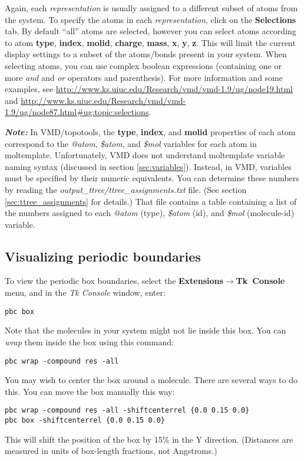 \documentclass[11pt]{article}
\begin{document}
Again, each \textit{representation} is usually assigned to
a different subset of atoms from the system.
To specify the atoms in each \textit{representation}, 
click on the \mbox{\textbf{Selections}} tab.
By default ``all''
atoms are selected, however you can select atoms according to atom 
\textbf{type}, \textbf{index}, \textbf{molid}, 
\textbf{charge}, \textbf{mass}, \textbf{x}, \textbf{y}, \textbf{z}.
This will limit the current display settings to a 
subset of the atoms/bonds present in your system.
When selecting atoms, you can use complex boolean expressions 
(containing one or more \textit{and} and \textit{or} operators 
and parenthesis).
For more information and some examples, 
see \url{http://www.ks.uiuc.edu/Research/vmd/vmd-1.9/ug/node19.html}
and
\url{http://www.ks.uiuc.edu/Research/vmd/vmd-1.9/ug/node87.html#ug:topic:selections}.


\textit{\textbf{Note:}}
In VMD/topotools, 
the \textbf{type}, \textbf{index}, and \textbf{molid} 
properties of each atom correspond 
to the \textit{@atom}, \textit{\$atom}, and \textit{\$mol} 
variables for each atom in moltemplate.
Unfortunately, VMD does not understand moltemplate variable naming syntax
(discussed in section \ref{sec:variables}). 
Instead, in VMD, variables must be 
specified by their numeric equivalents. 
You can determine these numbers by reading the 
\textit{output\_ttree/ttree\_assignments.txt} file.
(See section \ref{sec:ttree_assignments} for details.)
That file contains a table containing a list of the
numbers assigned to each \textit{@atom} (type), \textit{\$atom} (id),
and \textit{\$mol} (molecule-id) variable.





\subsection{Visualizing periodic boundaries}
\label{sec:vmd_pbc}
To view the periodic box boundaries, 
select the \textbf{Extensions}$\rightarrow$\mbox{\textbf{Tk Console}} menu,
and in the \textit{Tk Console} window, enter:
\begin{verbatim}
pbc box
\end{verbatim}
Note that the molecules in your system might not lie inside this box.
You can \textit{wrap} them inside the box using this command:
\begin{verbatim}
pbc wrap -compound res -all
\end{verbatim}
You may wish to center the box around a molecule.  There are several ways to
do this.  You can move the box manually this way:
\begin{verbatim}
pbc wrap -compound res -all -shiftcenterrel {0.0 0.15 0.0}
pbc box -shiftcenterrel {0.0 0.15 0.0}
\end{verbatim}
This will shift the position of the box by 15\% in the Y direction.
(Distances are measured in units of box-length fractions, not Angstroms.)
\end{document}
